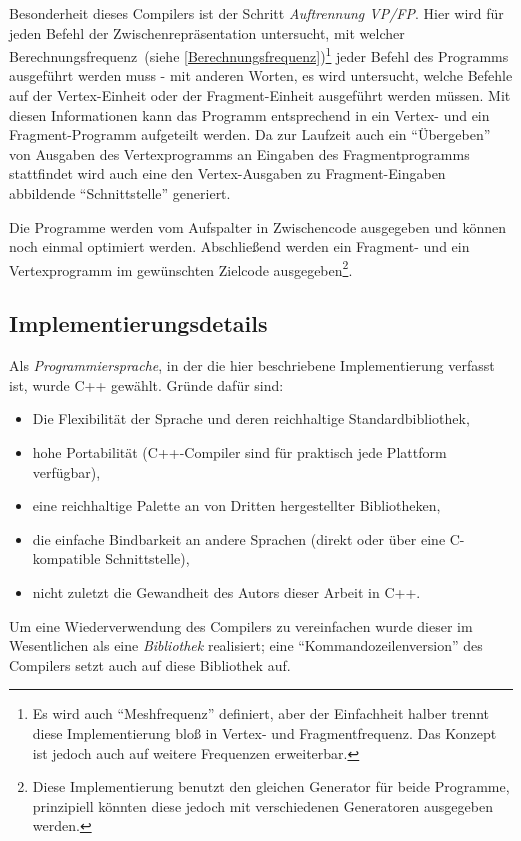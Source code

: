 \documentclass[twoside,a4paper,fleqn,12pt]{article}
\begin{document}
Besonderheit dieses Compilers ist der Schritt \emph{Auftrennung VP/FP}. Hier wird für jeden Befehl der Zwischenrepräsentation untersucht, mit
welcher Berechnungsfrequenz~(siehe \ref{Berechnungsfrequenz})\footnote{Es wird auch "`Meshfrequenz"' definiert, aber der Einfachheit halber
trennt diese Implementierung bloß in Vertex- und Fragmentfrequenz. Das Konzept ist jedoch auch auf weitere Frequenzen erweiterbar.}
jeder Befehl des Programms ausgeführt werden muss - mit anderen Worten,
es wird untersucht, welche Befehle auf der Vertex-Einheit oder der Fragment-Einheit ausgeführt werden müssen. Mit diesen Informationen kann
das Programm entsprechend in ein Vertex- und ein Fragment-Programm aufgeteilt werden. Da zur Laufzeit auch ein "`Übergeben"' von Ausgaben
des Vertexprogramms an Eingaben des Fragmentprogramms stattfindet wird auch eine den Vertex-Ausgaben zu Fragment-Eingaben
abbildende "`Schnittstelle"' generiert.

Die Programme werden vom Aufspalter in Zwischencode ausgegeben und können noch einmal optimiert werden. %
Abschließend werden ein Fragment- und ein Vertexprogramm im gewünschten Zielcode ausgegeben\footnote{Diese Implementierung benutzt den
gleichen Generator für beide Programme, prinzipiell könnten diese jedoch mit verschiedenen Generatoren ausgegeben werden.}.

\subsection{Implementierungsdetails}

Als \emph{Programmiersprache}, in der die hier beschriebene Implementierung verfasst ist, wurde C++ gewählt.
Gründe dafür sind:
\begin{itemize}
\item Die Flexibilität der Sprache und deren reichhaltige Standardbibliothek,
\item hohe Portabilität (C++-Compiler sind für praktisch jede Plattform verfügbar),
\item eine reichhaltige Palette an von Dritten hergestellter Bibliotheken,
\item die einfache Bindbarkeit an andere Sprachen (direkt oder über eine C-kompatible Schnittstelle),
\item nicht zuletzt die Gewandheit des Autors dieser Arbeit in C++.
\end{itemize}
 
Um eine Wiederverwendung des Compilers zu vereinfachen wurde dieser im Wesentlichen als eine \emph{Bibliothek} realisiert;
eine "`Kommandozeilenversion"' des Compilers setzt auch auf diese Bibliothek auf.
 
\end{document}
